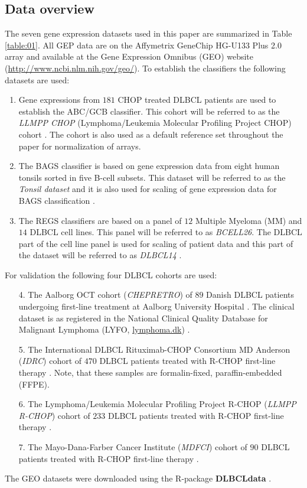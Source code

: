 \documentclass[10pt,letterpaper]{article}
\newcommand{\R}{\textsf{R}}
\newcommand{\pkg}[1]{\textbf{#1}}
\begin{document}
\subsection*{Data overview}
The seven gene expression datasets used in this paper are summarized in Table \ref{table:01}.
All GEP data are on the Affymetrix GeneChip HG-U133 Plus 2.0 array and available at the Gene Expression Omnibus (GEO) \cite{Barrett2013} website (\url{http://www.ncbi.nlm.nih.gov/geo/}).
To establish the classifiers the following datasets are used:
\begin{enumerate}
  \item Gene expressions from $181$ CHOP treated DLBCL patients are used to establish the ABC/GCB classifier.
  This cohort will be referred to as the \emph{LLMPP CHOP} (Lymphoma/Leukemia Molecular Profiling Project CHOP) cohort \cite{Lenz2008a}.
  The cohort is also used as a default reference set throughout the paper for normalization of arrays.
  \item The BAGS classifier is based on gene expression data from eight human tonsils sorted in five B-cell subsets.
  This dataset will be referred to as the \emph{Tonsil dataset} and it is also used for scaling of gene expression data for BAGS classification \cite{DybkaerBoegsted2015}.
  \item The REGS classifiers are based on a panel of $12$ Multiple Myeloma (MM) and $14$ DLBCL cell lines.
  This panel will be referred to as \emph{BCELL26}.
  The DLBCL part of the cell line panel is used for scaling of patient data and this part of the dataset will be referred to as   \emph{DLBCL14} \cite{Falgreen2015}.
\end{enumerate}
For validation the following four DLBCL cohorts are used:
\begin{enumerate}
  \item[4.] The Aalborg OCT cohort (\emph{CHEPRETRO}) of $89$ Danish DLBCL patients undergoing first-line treatment at Aalborg University Hospital \cite{DybkaerBoegsted2015}.
  The clinical dataset is as registered in the National Clinical Quality Database for Malignant Lymphoma (LYFO, \url{lymphoma.dk}) \cite{Gang2012}.
  \item[5.] The International DLBCL Rituximab-CHOP Consortium MD Anderson (\emph{IDRC}) cohort of $470$ DLBCL patients treated with R-CHOP first-line therapy \cite{Visco2012}.
  Note, that these samples are formalin-fixed, paraffin-embedded (FFPE).
  \item[6.] The Lymphoma/Leukemia Molecular Profiling Project R-CHOP (\emph{LLMPP R-CHOP}) cohort of $233$ DLBCL patients treated with R-CHOP first-line therapy \cite{Lenz2008a}.
  \item[7.] The Mayo-Dana-Farber Cancer Institute (\emph{MDFCI}) cohort of $90$ DLBCL patients treated with R-CHOP first-line therapy \cite{Monti2012a}.
\end{enumerate}
The GEO datasets were downloaded using the \R{}-package \pkg{DLBCLdata} \cite{DLBCLdata}.
\end{document}
